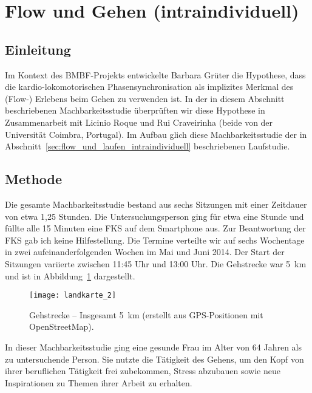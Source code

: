 

\section{Flow und Gehen (intraindividuell)} 

\label{sec:flow_und_gehen_intraindividuell}

\subsection{Einleitung} 

\label{sub:einleitung_5_2}

Im Kontext des \acs{BMBF}-Projekts entwickelte Barbara Grüter die Hypothese, dass die kardio-lokomotorischen Phasensynchronisation als implizites Merkmal des (Flow-) Erlebens beim Gehen zu verwenden ist. In der in diesem Abschnitt beschriebenen Machbarkeitsstudie überprüften wir diese Hypothese in Zusammenarbeit mit Licinio Roque und Rui Craveirinha (beide von der Universität Coimbra, Portugal). Im Aufbau glich diese Machbarkeitsstudie der in Abschnitt~\ref{sec:flow_und_laufen_intraindividuell} beschriebenen Laufstudie. 

\subsection{Methode} 

\label{sub:methode_5_2}

Die gesamte Machbarkeitsstudie bestand aus sechs Sitzungen mit einer Zeitdauer von etwa 1,25 Stunden. Die Untersuchungsperson ging für etwa eine Stunde und füllte alle 15 Minuten eine \ac{FKS} auf dem Smartphone aus. Zur Beantwortung der \ac{FKS} gab ich keine Hilfestellung. Die Termine verteilte wir auf sechs Wochentage in zwei aufeinanderfolgenden Wochen im Mai und Juni 2014. Der Start der Sitzungen variierte zwischen 11:45 Uhr und 13:00 Uhr. Die Gehstrecke war 5~km und ist in Abbildung~\ref{fig:landkarte_2} dargestellt. 
\begin{figure}
	[!htb] \centering 
	\texttt{[image: landkarte\_2]} \caption[Gehstrecke.]{Gehstrecke -- Insgesamt 5~km (erstellt aus \acs{GPS}-Positionen mit OpenStreetMap).} \label{fig:landkarte_2} 
\end{figure}

In dieser Machbarkeitsstudie ging eine gesunde Frau im Alter von 64 Jahren als zu untersuchende Person. Sie nutzte die Tätigkeit des Gehens, um den Kopf von ihrer beruflichen Tätigkeit frei zubekommen, Stress abzubauen sowie neue Inspirationen zu Themen ihrer Arbeit zu erhalten.

